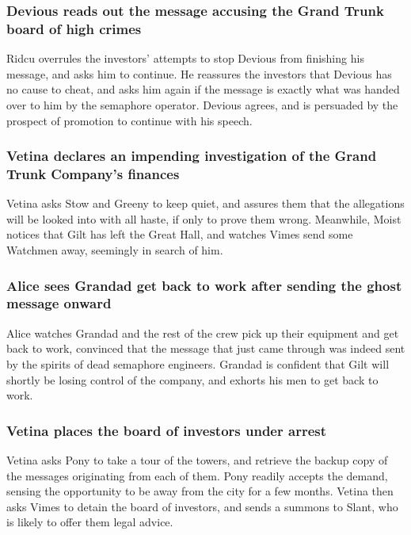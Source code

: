 \subsubsection{\Gls{Devious} reads out the message accusing the Grand Trunk board of high crimes}
\Gls{Ridcu} overrules the investors' attempts to stop \Gls{Devious} from finishing his message, and
asks him to continue. He reassures the investors that \Gls{Devious} has no cause to cheat, and asks
him again if the message is exactly what was handed over to him by the semaphore operator.
\Gls{Devious} agrees, and is persuaded by the prospect of promotion to continue with his speech.

\subsubsection{\Gls{Vetina} declares an impending investigation of the Grand Trunk Company's
    finances}
\Gls{Vetina} asks \Gls{Stow} and \Gls{Greeny} to keep quiet, and assures them that the allegations
will be looked into with all haste, if only to prove them wrong. Meanwhile, \Gls{Moist} notices that
\Gls{Gilt} has left the Great Hall, and watches \Gls{Vimes} send some Watchmen away, seemingly in
search of him.

\subsubsection{\Gls{Alice} sees \Gls{Grandad} get back to work after sending the ghost message
    onward}
\Gls{Alice} watches \Gls{Grandad} and the rest of the crew pick up their equipment and get back to
work, convinced that the message that just came through was indeed sent by the spirits of dead
semaphore engineers. \Gls{Grandad} is confident that \Gls{Gilt} will shortly be losing control of
the company, and exhorts his men to get back to work.

\subsubsection{\Gls{Vetina} places the board of investors under arrest}
\Gls{Vetina} asks \Gls{Pony} to take a tour of the towers, and retrieve the backup copy of the
messages originating from each of them. \Gls{Pony} readily accepts the demand, sensing the
opportunity to be away from the city for a few months. \Gls{Vetina} then asks \Gls{Vimes} to
detain the board of investors, and sends a summons to \Gls{Slant}, who is likely to offer them
legal advice.

